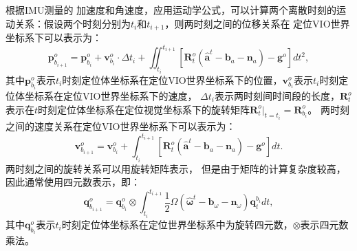 根据IMU测量的
加速度和角速度，应用运动学公式，可以计算两个离散时刻的运动关系：假设两个时刻分别为$t_i$和$t_{i+1}$，则两时刻之间的位移关系在
定位VIO世界坐标系下可以表示为：
\begin{equation}
  \label{eq:position}
  \symbf{p}_{b_{i+1}}^o=\symbf{p}_{b_i}^o+\symbf{v}_{b_i}^o\cdot\Delta t_i+\iint_{t_i}^{t_{i+1}}[\symbf{R}_t^o(\symbf{\hat{a}}^t-\symbf{b}_{a}-\symbf{n}_{a})-\symbf{g}^o]dt^2,
\end{equation}
其中$\symbf{p}_{b_{i}}^o$表示$t_i$时刻定位体坐标系在定位VIO世界坐标系下的位置，$\symbf{v}_{b_i}^o$表示$t_i$时刻定位体坐标系在定位VIO世界坐标系下的速度，
$\Delta t_i$表示两时刻间时间段的长度，$\symbf{R}_t^o$表示在$t$时刻定位体坐标系在定位视觉坐标系下的旋转矩阵$\symbf{R}_t^o|_{t=t_i}=\symbf{R}_{b_i}^o$。
两时刻之间的速度关系在定位VIO世界坐标系下可以表示为：
\begin{equation}
  \label{eq:velocity}
  \symbf{v}_{b_{i+1}}^o=\symbf{v}_{b_i}^o+\int_{t_i}^{t_{i+1}}[\symbf{R}_t^o(\symbf{\hat{a}}^t-\symbf{b}_a-\symbf{n}_a)-\symbf{g}^o]dt.
\end{equation}
两时刻之间的旋转关系可以用旋转矩阵表示，
但是由于矩阵的计算复杂度较高，因此通常使用四元数表示，即：
\begin{equation}
  \label{eq:rotation}
  \symbf{q}_{b_{i+1}}^o=\symbf{q}_{b_i}^o\otimes\int_{t_i}^{t_{i+1}}\frac12\Omega(\widehat{\symbf{\omega}}^t-\symbf{b}_\omega-\symbf{n}_\omega)\symbf{q}_t^{b_i}dt,
\end{equation}
其中$\symbf{q}_{b_i}^o$表示$t_i$时刻定位体坐标系在定位世界坐标系中为旋转四元数，$\otimes$表示四元数乘法。

